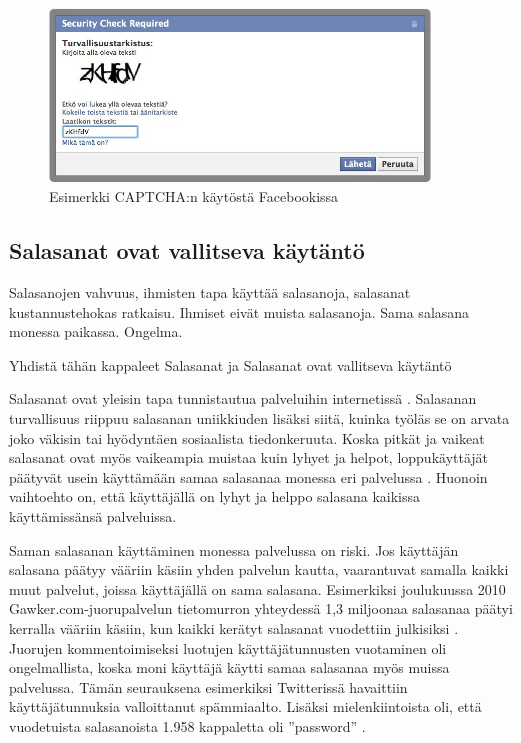 \documentclass[finnish,gradu]{tktltiki}
\begin{document}
  \begin{figure}
    \centering
    \includegraphics[width=0.9\textwidth]{images/Facebook_captcha_filled.jpg}
    \caption{Esimerkki CAPTCHA:n käytöstä Facebookissa}
    \label{fig:yleiskuva}
  \end{figure}


  \subsection{Salasanat ovat vallitseva käytäntö} %
  \label{sub:salasanat}
  Salasanojen vahvuus, ihmisten tapa käyttää salasanoja, salasanat kustannustehokas ratkaisu.
  Ihmiset eivät muista salasanoja. Sama salasana monessa paikassa. Ongelma.

  Yhdistä tähän kappaleet Salasanat ja Salasanat ovat vallitseva käytäntö

  Salasanat ovat yleisin tapa tunnistautua palveluihin internetissä \cite{study_of_passwords_07, passpet_06, password_management_strategies_06, pwdhash_extension_05}.
  Salasanan turvallisuus riippuu salasanan uniikkiuden lisäksi siitä, kuinka työläs se on arvata joko väkisin tai hyödyntäen sosiaalista tiedonkeruuta. Koska pitkät ja vaikeat salasanat ovat myös vaikeampia muistaa kuin lyhyet ja helpot, loppukäyttäjät päätyvät usein käyttämään samaa salasanaa monessa eri palvelussa \cite{study_of_passwords_07}. Huonoin vaihtoehto on, että käyttäjällä on lyhyt ja helppo salasana kaikissa käyttämissänsä palveluissa.

  Saman salasanan käyttäminen monessa palvelussa on riski. Jos käyttäjän salasana päätyy vääriin käsiin yhden palvelun kautta, vaarantuvat samalla kaikki muut palvelut, joissa käyttäjällä on sama salasana. Esimerkiksi joulukuussa 2010 Gawker.com-juorupalvelun tietomurron yhteydessä 1,3 miljoonaa salasanaa päätyi kerralla vääriin käsiin, kun kaikki kerätyt salasanat vuodettiin julkisiksi \cite{bbc_gawker_12_2010, forbes_gawker_12_2010}. Juorujen kommentoimiseksi luotujen käyttäjätunnusten vuotaminen oli ongelmallista, koska moni käyttäjä käytti samaa salasanaa myös muissa palvelussa. Tämän seurauksena esimerkiksi Twitterissä havaittiin käyttäjätunnuksia valloittanut spämmiaalto. Lisäksi mielenkiintoista oli, että vuodetuista salasanoista 1.958 kappaletta oli ''password'' \cite{forbes_gawker_12_2010}.
\end{document}
